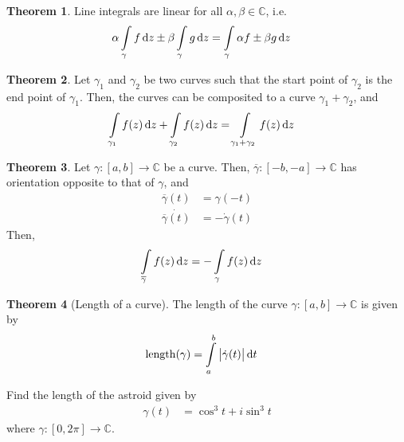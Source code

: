 \documentclass[titlepage, fleqn, a4paper, 12pt, twoside]{article}
\theoremstyle{definition}
\theoremstyle{theorem}
\newtheorem{theorem}{Theorem}
\DeclareMathOperator{\length}{length}
\begin{document}
\begin{theorem}
	Line integrals are linear for all $\alpha,\beta \in \mathbb{C}$, i.e.
	\begin{align*}
		\alpha \int\limits_{\gamma} f \dif z \pm \beta \int\limits_{\gamma} g \dif z & = \int\limits_{\gamma} \alpha f \pm \beta g \dif z
	\end{align*}
\end{theorem}

\begin{theorem}
	Let $\gamma_1$ and $\gamma_2$ be two curves such that the start point of $\gamma_2$ is the end point of $\gamma_1$.
	Then, the curves can be composited to a curve $\gamma_1 + \gamma_2$, and
	\begin{align*}
		\int\limits_{\gamma_1} f(z) \dif z + \int\limits_{\gamma_2} f(z) \dif z & = \int\limits_{\gamma_1 + \gamma_2} f(z) \dif z
	\end{align*}
\end{theorem}

\begin{theorem}
	Let $\gamma : [a,b] \to \mathbb{C}$ be a curve.
	Then, $\overline{\gamma} : [-b,-a] \to \mathbb{C}$ has orientation opposite to that of $\gamma$, and
	\begin{align*}
		\overline{\gamma}(t)       & = \gamma(-t) \\
		\dot{\overline{\gamma}(t)} & = -\dot{\gamma}(t)
	\end{align*}
	Then,
	\begin{align*}
		\int\limits_{\overline{\gamma}} f(z) \dif z & = -\int\limits_{\gamma} f(z) \dif z
	\end{align*}
\end{theorem}

\begin{theorem}[Length of a curve]
	The length of the curve $\gamma : [a,b] \to \mathbb{C}$ is given by
	\begin{align*}
		\length(\gamma) & = \int\limits_{a}^{b} \left| \dot{\gamma}(t) \right| \dif t
	\end{align*}
\end{theorem}

\begin{question}
	Find the length of the astroid given by
	\begin{align*}
		\gamma(t) & = \cos^3 t + i \sin^3 t
	\end{align*}
	where $\gamma : [0,2 \pi] \to \mathbb{C}$.
\end{question}
\end{document}
